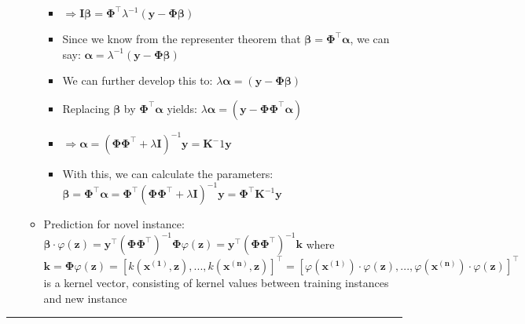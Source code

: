 \begin{itemize}
\begin{itemize}
\begin{itemize}
            \item $\Rightarrow \boldsymbol{I} \boldsymbol{\beta} = \boldsymbol{\Phi}^\intercal \lambda^{-1}  (\boldsymbol{y} - \boldsymbol{\Phi} \boldsymbol{\beta})$
            \item Since we know from the representer theorem that $\boldsymbol{\beta} = \boldsymbol{\Phi}^\intercal \boldsymbol{\alpha}$, we can say: $\boldsymbol{\alpha} = \lambda^{-1}  (\boldsymbol{y} - \boldsymbol{\Phi} \boldsymbol{\beta})$ 
            \item We can further develop this to: $\lambda \boldsymbol{\alpha} = (\boldsymbol{y} - \boldsymbol{\Phi} \boldsymbol{\beta})$
            \item Replacing $\boldsymbol{\beta}$ by $\boldsymbol{\Phi}^\intercal \boldsymbol{\alpha}$ yields: $\lambda \boldsymbol{\alpha} = (\boldsymbol{y} - \boldsymbol{\Phi} \boldsymbol{\Phi}^\intercal \boldsymbol{\alpha})$
            \item $\Rightarrow \boldsymbol{\alpha} = (\boldsymbol{\Phi} \boldsymbol{\Phi}^\intercal + \lambda \boldsymbol{I})^{-1} \boldsymbol{y} = \boldsymbol{K}^-1 \boldsymbol{y}$
            \item With this, we can calculate the parameters: $\boldsymbol{\beta} = \boldsymbol{\Phi}^\intercal \boldsymbol{\alpha} = \boldsymbol{\Phi}^\intercal (\boldsymbol{\Phi} \boldsymbol{\Phi}^\intercal + \lambda \boldsymbol{I})^{-1} \boldsymbol{y} = \boldsymbol{\Phi}^\intercal \boldsymbol{K}^{-1} \boldsymbol{y}$
        \end{itemize}
        \item Prediction for novel instance: $\boldsymbol{\beta} \cdot \varphi({\boldsymbol{z}}) = \boldsymbol{y}^\intercal (\boldsymbol{\Phi} \boldsymbol{\Phi}^\intercal)^{-1}  \boldsymbol{\Phi} \varphi({\boldsymbol{z}}) = \boldsymbol{y}^\intercal (\boldsymbol{\Phi} \boldsymbol{\Phi}^\intercal)^{-1} \boldsymbol{k}$ where $\boldsymbol{k} = \boldsymbol{\Phi} \varphi({\boldsymbol{z}}) = [ k(\boldsymbol{x^{(1)}}, \boldsymbol{z}), ..., k(\boldsymbol{x^{(n)}}, \boldsymbol{z}) ]^\intercal = [ \varphi(\boldsymbol{x^{(1)}}) \cdot \varphi(\boldsymbol{z}), ..., \varphi(\boldsymbol{x^{(n)}}) \cdot \varphi(\boldsymbol{z}) ]^\intercal$ is a kernel vector, consisting of kernel values between training instances and new instance
    \end{itemize}
\end{itemize}

{\color{lightgray}\hrule height 0.001mm}

